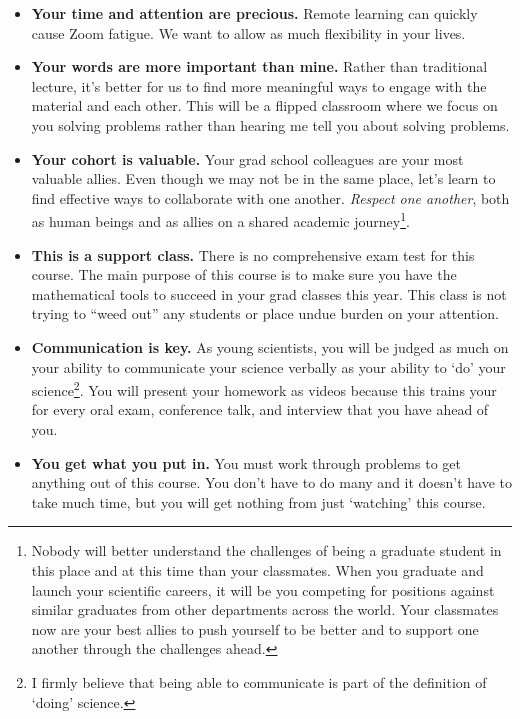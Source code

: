 \documentclass[12pt]{article}
\numberwithin{equation}{section}    %
\begin{document}
\begin{itemize}
	\item \textbf{Your time and attention are precious.} Remote learning can quickly cause Zoom fatigue. We want to allow as much flexibility in your lives.

	\item \textbf{Your words are more important than mine.} Rather than traditional lecture, it's better for us to find more meaningful ways to engage with the material and each other. This will be a flipped classroom where we focus on you solving problems rather than hearing me tell you about solving problems.

	\item \textbf{Your cohort is valuable.} Your grad school colleagues are your most valuable allies. Even though we may not be in the same place, let's learn to find effective ways to collaborate with one another. \emph{Respect one another}, both as human beings and as allies on a shared academic journey\footnote{Nobody will better understand the challenges of being a graduate student in this place and at this time than your classmates. When you graduate and launch your scientific careers, it will be you competing for positions against similar graduates from other departments across the world. Your classmates now are your best allies to push yourself to be better and to support one another through the challenges ahead.}.

	\item \textbf{This is a support class.} There is no comprehensive exam test for this course. The main purpose of this course is to make sure you have the mathematical tools to succeed in your grad classes this year. This class is not trying to ``weed out'' any students or place undue burden on your attention. 

	\item \textbf{Communication is key.} As young scientists, you will be judged as much on your ability to communicate your science verbally as your ability to `do' your science\footnote{I firmly believe that being able to communicate is part of the definition of `doing' science.}. You will present your homework as videos because this trains your for every oral exam, conference talk, and interview that you have ahead of you.
	
	\item \textbf{You get what you put in.} You must work through problems to get anything out of this course. You don't have to do many and it doesn't have to take much time, but you will get nothing from just `watching' this course.
\end{itemize}
 
\end{document}
